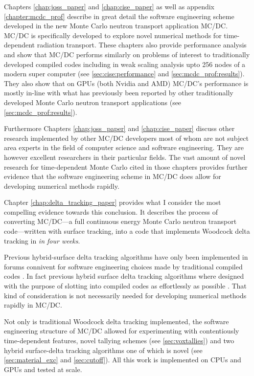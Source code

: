Chapters \ref{chap:joss_paper} and \ref{chap:cise_paper} as well as appendix \ref{chapter:mcdc_prof} describe in great detail the software engineering scheme developed in the new Monte Carlo neutron transport application MC/DC.
MC/DC is specifically developed to explore novel numerical methods for time-dependent radiation transport.
These chapters also provide performance analysis and show that MC/DC performs similarly on problems of interest to traditionally developed compiled codes including in weak scaling analysis upto 256 nodes of a modern super computer (see \ref{sec:cise:performance} and \ref{sec:mcdc_prof:results}).
They also show that on GPUs (both Nvidia and AMD) MC/DC's performance is mostly in-line with what has previously been reported by other traditionally developed Monte Carlo neutron transport applications (see \ref{sec:mcdc_prof:results}).

Furthermore Chapters \ref{chap:joss_paper} and \ref{chap:cise_paper} discuss other research implemented by other MC/DC developers most of whom are not subject area experts in the field of computer science and software engineering.
They are however excellent researchers in their particular fields.
The vast amount of novel research for time-dependent Monte Carlo cited in those chapters provides further evidence that the software engineering scheme in MC/DC does allow for developing numerical methods rapidly.

Chapter \ref{chap:delta_tracking_paper} provides what I consider the most compelling evidence towards this conclusion.
It describes the process of converting MC/DC---a full continuous energy Monte Carlo neutron transport code---written with surface tracking, into a code that implements Woodcock delta tracking in \emph{in four weeks}.

Previous hybrid-surface delta tracking algorithms have only been implemented in forums connivent for software engineering choices made by traditional compiled codes \cite{leppanen_development_2013conf}.
In fact previous hybrid surface delta tracking algorithms where designed with the purpose of slotting into compiled codes as effortlessly as possible \cite{morgan2023delta}.
That kind of consideration is not necessarily needed for developing numerical methods rapidly in MC/DC.

Not only is traditional Woodcock delta tracking implemented, the software engineering structure of MC/DC allowed for experimenting with contentiously time-dependent features, novel tallying schemes (see \ref{sec:voxtallies}) and two hybrid surface-delta tracking algorithms one of which is novel (see \ref{sec:material_exc} and \ref{sec:cutoff}).
All this work is implemented on CPUs and GPUs and tested at scale.

